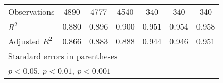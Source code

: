 {\begin{tabular}{l*{6}{c}}
\hline
Observations        &        4890         &        4777         &        4540         &         340         &         340         &         340         \\
\(R^{2}\)           &       0.880         &       0.896         &       0.900         &       0.951         &       0.954         &       0.958         \\
Adjusted \(R^{2}\)  &       0.866         &       0.883         &       0.888         &       0.944         &       0.946         &       0.951         \\
\hline\hline
\multicolumn{7}{l}{\footnotesize Standard errors in parentheses}\\
\multicolumn{7}{l}{\footnotesize \sym{*} \(p<0.05\), \sym{**} \(p<0.01\), \sym{***} \(p<0.001\)}\\
\end{tabular}
}
